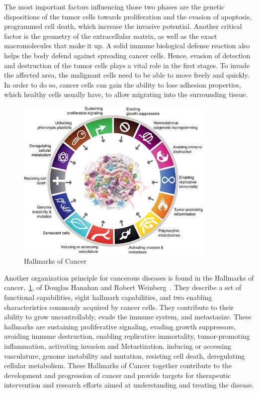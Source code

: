 The most important factors influencing those two phases are the genetic dispositions of the tumor cells towards proliferation and the evasion of apoptosis, programmed cell death, which increase the invasive potential. Another critical factor is the geometry of the extracellular matrix, as well as the exact macromolecules that make it up. A solid immune biological defense reaction also helps the body defend against spreading cancer cells. Hence, evasion of detection and destruction of the tumor cells plays a vital role in the first stages. To invade the affected area, the malignant cells need to be able to move freely and quickly. In order to do so, cancer cells can gain the ability to lose adhesion properties, which healthy cells usually have, to allow migrating into the surrounding tissue.
\begin{figure}[h]
    \centering
    \includegraphics[width=0.85\textwidth]{resources/images/Hallmarks-of-Cancer.jpg}
    \caption{Hallmarks of Cancer}
    \label{fig:hallmarks_of_cancer}
\end{figure}
Another organization principle for cancerous diseases is found in the Hallmarks of cancer,~\ref{fig:hallmarks_of_cancer}, of Douglas Hanahan and Robert Weinberg~\cite{10.1158/2159-8290.CD-21-1059}. They describe a set of functional capabilities, eight hallmark capabilities, and two enabling characteristics commonly acquired by cancer cells. They contribute to their ability to grow uncontrollably, evade the immune system, and metastasize. These hallmarks are sustaining proliferative signaling, evading growth suppressors, avoiding immune destruction, enabling replicative immortality, tumor-promoting inflammation, activating invasion and Metastization, inducing or accessing vasculature, genome instability and mutation, resisting cell death, deregulating cellular metabolism. These Hallmarks of Cancer together contribute to the development and progression of cancer and provide targets for therapeutic intervention and research efforts aimed at understanding and treating the disease. 

